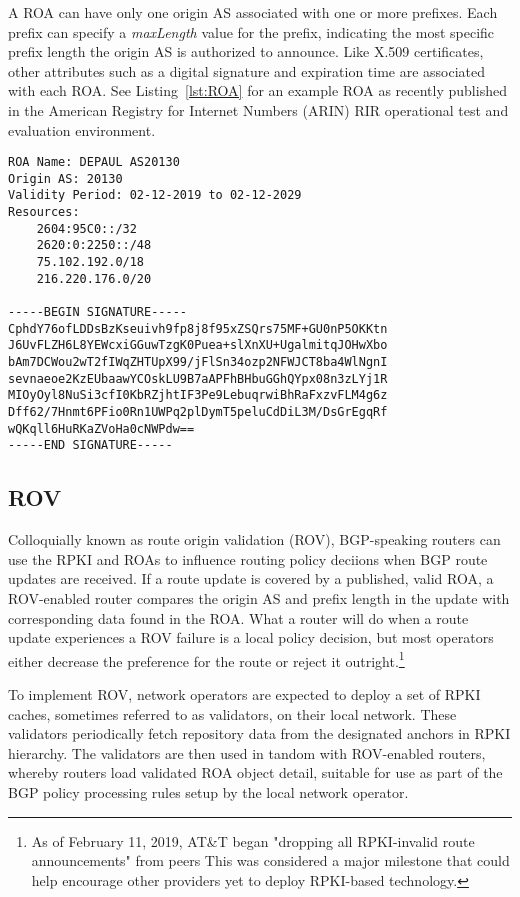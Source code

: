 \documentclass[sigconf]{acmart}
\begin{document}
A ROA can have only one origin AS associated with one or more prefixes.
Each prefix can specify a \emph{maxLength} value for the prefix,
indicating the most specific prefix length the origin AS is authorized
to announce.  Like X.509 certificates, other attributes such as a
digital signature and expiration time are associated with each ROA.  See
Listing~\ref{lst:ROA} for an example ROA as recently published in the
American Registry for Internet Numbers (ARIN) RIR operational test and
evaluation environment.

\begin{lstlisting}[float,basicstyle=\footnotesize\ttfamily,caption={Example AS 20130 ROA},label={lst:ROA}]
ROA Name: DEPAUL AS20130
Origin AS: 20130
Validity Period: 02-12-2019 to 02-12-2029
Resources:
    2604:95C0::/32
    2620:0:2250::/48
    75.102.192.0/18
    216.220.176.0/20

-----BEGIN SIGNATURE-----
CphdY76ofLDDsBzKseuivh9fp8j8f95xZSQrs75MF+GU0nP5OKKtn
J6UvFLZH6L8YEWcxiGGuwTzgK0Puea+slXnXU+UgalmitqJOHwXbo
bAm7DCWou2wT2fIWqZHTUpX99/jFlSn34ozp2NFWJCT8ba4WlNgnI
sevnaeoe2KzEUbaawYCOskLU9B7aAPFhBHbuGGhQYpx08n3zLYj1R
MIOyOyl8NuSi3cfI0KbRZjhtIF3Pe9LebuqrwiBhRaFxzvFLM4g6z
Dff62/7Hnmt6PFio0Rn1UWPq2plDymT5peluCdDiL3M/DsGrEgqRf
wQKqll6HuRKaZVoHa0cNWPdw==
-----END SIGNATURE-----
\end{lstlisting}

\subsection{ROV}

Colloquially known as route origin validation (ROV), BGP-speaking
routers can use the RPKI and ROAs to influence routing policy deciions
when BGP route updates are received.\cite{bush_origin_2014}  If a route
update is covered by a published, valid ROA, a ROV-enabled router
compares the origin AS and prefix length in the update with
corresponding data found in the ROA.  What a router will do when a route
update experiences a ROV failure is a local policy decision, but most
operators either decrease the preference for the route or reject it
outright.\footnote{As of February 11, 2019, AT\&T began "dropping all
RPKI-invalid route announcements" from
peers\cite{borkenhagen_at&t/as7018_2019}  This was considered a major
milestone that could help encourage other providers yet to deploy
RPKI-based technology.}

To implement ROV, network operators are expected to deploy a set of RPKI
caches, sometimes referred to as validators, on their local network.
These validators periodically fetch repository data from the designated
anchors in RPKI hierarchy.  The validators are then used in tandom with
ROV-enabled routers, whereby routers load validated ROA object detail,
suitable for use as part of the BGP policy processing rules setup by the
local network operator.
\end{document}
